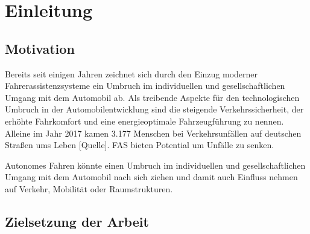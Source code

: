 \chapter{Einleitung} \label{cha:einleitung}

\section{Motivation} \label{sec:motivation}
Bereits seit einigen Jahren zeichnet sich durch den Einzug moderner Fahrerassistenzsysteme ein Umbruch im individuellen und gesellschaftlichen Umgang mit dem Automobil ab. Als treibende Aspekte für den technologischen Umbruch in der Automobilentwicklung sind die steigende Verkehrssicherheit, der erhöhte Fahrkomfort und eine energieoptimale Fahrzeugführung zu nennen. Alleine im Jahr 2017 kamen 3.177 Menschen bei Verkehrsunfällen auf deutschen Straßen ums Leben [Quelle].
FAS bieten Potential um Unfälle zu senken. 

Autonomes Fahren könnte einen Umbruch im individuellen und gesellschaftlichen Umgang
mit dem Automobil nach sich ziehen und damit auch Einfluss nehmen auf Verkehr,
Mobilität oder Raumstrukturen.

\section{Zielsetzung der Arbeit} \label{sec:aufgabenstellung}
\lipsum[1-3]